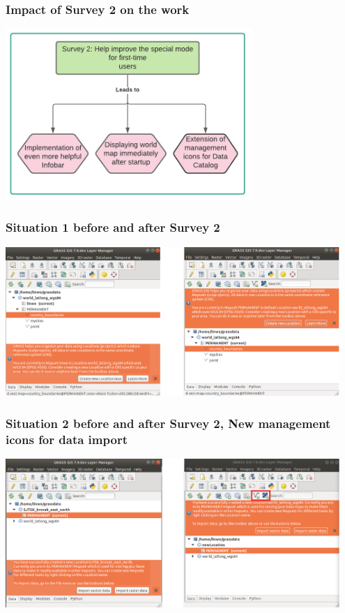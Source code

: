 \documentclass[aspectratio=169]{beamer}
\begin{document}
\begin{frame}
\frametitle{Impact of Survey 2 on the work}
	\centering
        \includegraphics[width=0.7\textwidth]{pictures/survey2.PNG}
\end{frame}

\begin{frame}
\frametitle{Situation 1 before and after Survey 2}
	\centering
        \includegraphics[width=0.95\textwidth]{pictures/info1.PNG}
\end{frame}

\begin{frame}
\frametitle{Situation 2 before and after Survey 2, New management icons for data import}
	\centering
        \includegraphics[width=0.95\textwidth]{pictures/info2.PNG}
\end{frame}
\end{document}
